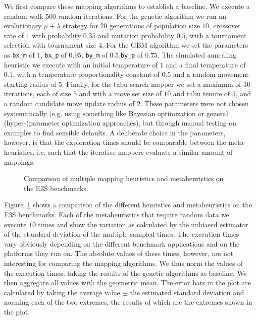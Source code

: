 We first compare these mapping algorithms to establish a baseline. 
We execute a random walk $500$ random iterations.
For the genetic algorithm we run an evolutionary $\mu + \lambda$ strategy for $20$ generations of population size $10$, crossover rate of $1$ with probability $0.35$ and mutation probability $0.5$, with a tournament selection with tournament size $4$.
For the \ac{GBM} algorithm we set the parameters as \texttt{bx\_m} of $1$, \texttt{bx\_p} of $0.95$, \texttt{by\_m} of $0.5$,\texttt{by\_p} of $0.75$, 
The simulated annealing heuristic we execute with an initial temperature of $1$ and a final temperature of $0.1$, with a temperature proportionality constant of $0.5$  and a random movement starting radius of $5$.
Finally, for the tabu search mapper we set a maximum of $30$ iterations, each of size $5$ and with a move set size of $10$ and tabu tenure of $5$, and a random candidate move update radius of $2$.
These parameters were not chosen systematically (e.g. using something like Bayesian optimization or general (hyper-)parameter optimization approaches), but through manual testing on examples to find sensible defaults.
A deliberate choice in the parameters, however, is that the exploration times should be comparable between the meta-heuristics, i.e. such that the iterative mappers evaluate a similar amount of mappings.

\begin{figure}[h]
	\centering
   \resizebox{0.95\textwidth}{!}{}
	\caption{Comparison of multiple mapping heuristics and metaheuristics on the \ac{E3S} benchmarks.}
	\label{fig:heuristics_vs_metaheuristics}
\end{figure}

Figure~\ref{fig:heuristics_vs_metaheuristics} shows a comparison of the different heuristics and metaheuristics on the \ac{E3S} benchmarks.
Each of the metaheuristics that require random data we execute $10$ times and show the variation as calculated by the unbiased estimator of the standard deviation of the multiple sampled times.
The execution times vary obviously depending on the different benchmark applications and on the platforms they run on.
The absolute values of these times, however, are not interesting for comparing the mapping algorithms.
We thus norm the values of the execution times, taking the results of the genetic algorithms as baseline.
We then aggregate all values with the geometric mean.
The error bars in the plot are calculated by taking the average value $\pm$ the estimated standard deviation and norming each of the two extremes, the results of which are the extremes shown in the plot.

